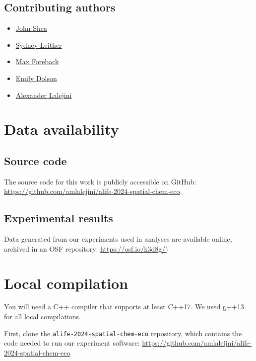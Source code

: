 \documentclass[
]{book}
\providecommand{\tightlist}{%
  \setlength{\itemsep}{0pt}\setlength{\parskip}{0pt}}
\begin{document}
\hypertarget{contributing-authors}{%
\section{Contributing authors}\label{contributing-authors}}

\begin{itemize}
\tightlist
\item
  \href{https://github.com/John-Shea}{John Shea}
\item
  \href{https://github.com/sydleither}{Sydney Leither}
\item
  \href{https://github.com/Max-Foreback}{Max Foreback}
\item
  \href{https://ecodelab.com/}{Emily Dolson}
\item
  \href{https://lalejini.com}{Alexander Lalejini}
\end{itemize}

\hypertarget{data-availability}{%
\chapter{Data availability}\label{data-availability}}

\hypertarget{source-code}{%
\section{Source code}\label{source-code}}

The source code for this work is publicly accessible on GitHub: \url{https://github.com/amlalejini/alife-2024-spatial-chem-eco}.

\hypertarget{experimental-results}{%
\section{Experimental results}\label{experimental-results}}

Data generated from our experiments used in analyses are available online, archived in an OSF repository: \url{https://osf.io/k3d8g/)}

\hypertarget{local-compilation}{%
\chapter{Local compilation}\label{local-compilation}}

You will need a C++ compiler that supports at least C++17.
We used g++13 for all local compilations.

First, clone the \texttt{alife-2024-spatial-chem-eco} repository, which contains the code needed to run our experiment software:
\url{https://github.com/amlalejini/alife-2024-spatial-chem-eco}
\end{document}
